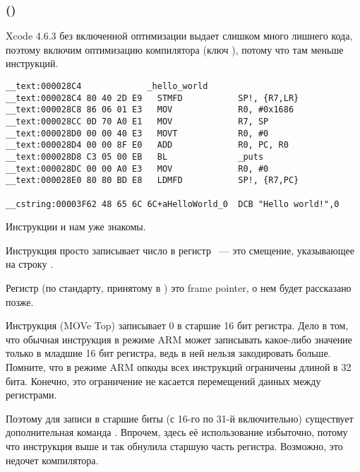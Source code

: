 \subsubsection{\OptimizingXcodeIV (\ARMMode)}

Xcode 4.6.3 без включенной оптимизации выдает слишком много лишнего кода, поэтому включим оптимизацию компилятора (ключ \Othree), потому что там меньше инструкций.

\begin{lstlisting}[caption=\OptimizingXcodeIV (\ARMMode),style=customasmARM]
__text:000028C4             _hello_world
__text:000028C4 80 40 2D E9   STMFD           SP!, {R7,LR}
__text:000028C8 86 06 01 E3   MOV             R0, #0x1686
__text:000028CC 0D 70 A0 E1   MOV             R7, SP
__text:000028D0 00 00 40 E3   MOVT            R0, #0
__text:000028D4 00 00 8F E0   ADD             R0, PC, R0
__text:000028D8 C3 05 00 EB   BL              _puts
__text:000028DC 00 00 A0 E3   MOV             R0, #0
__text:000028E0 80 80 BD E8   LDMFD           SP!, {R7,PC}

__cstring:00003F62 48 65 6C 6C+aHelloWorld_0  DCB "Hello world!",0
\end{lstlisting}

Инструкции  и  нам уже знакомы.

Инструкция \MOV просто записывает число  в регистр ~--- это смещение, указывающее на строку .

Регистр  (по стандарту, принятому в \IOSABI) это frame pointer, о нем будет рассказано позже.

Инструкция  (MOVe Top) записывает 0 в старшие 16 бит регистра.
Дело в том, что обычная инструкция \MOV в режиме ARM может записывать какое-либо значение только в младшие 16 бит регистра, ведь в ней нельзя закодировать больше.
Помните, что в режиме ARM опкоды всех инструкций ограничены длиной в 32 бита. Конечно, это ограничение не касается перемещений данных между регистрами.

Поэтому для записи в старшие биты (с 16-го по 31-й включительно) существует дополнительная команда .
Впрочем, здесь её использование избыточно, потому что инструкция  выше и так обнулила старшую часть регистра.
Возможно, это недочет компилятора.

